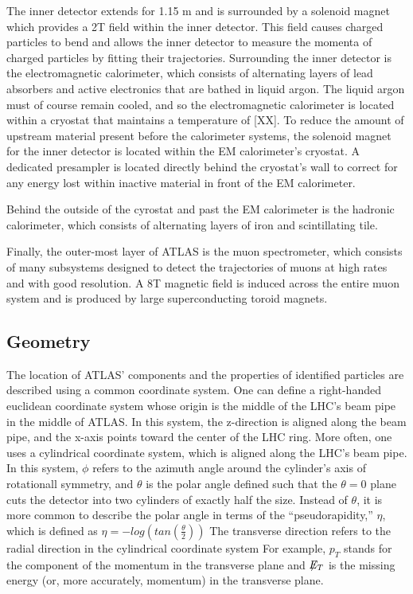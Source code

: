 The inner detector extends for 1.15 m and is surrounded by a solenoid magnet which provides a 2T field within the inner detector.
This field causes charged particles to bend and allows the inner detector to measure the momenta of charged particles by fitting their trajectories.
Surrounding the inner detector is the electromagnetic calorimeter, which consists of alternating layers of lead absorbers and active electronics that are bathed in liquid argon.
The liquid argon must of course remain cooled, and so the electromagnetic calorimeter is located within a cryostat that maintains a temperature of [XX].
To reduce the amount of upstream material present before the calorimeter systems, the solenoid magnet for the inner detector is located within the EM calorimeter's cryostat.
A dedicated presampler is located directly behind the cryostat's wall to correct for any energy lost within inactive material in front of the EM calorimeter.

Behind the outside of the cyrostat and past the EM calorimeter is the hadronic calorimeter, which consists of alternating layers of iron and scintillating tile.

Finally, the outer-most layer of ATLAS is the muon spectrometer, which consists of many subsystems designed to detect the trajectories of muons at high rates and with good resolution. 
A 8T magnetic field is induced across the entire muon system and is produced by large superconducting toroid magnets.


\subsection{Geometry}
The location of ATLAS' components and the properties of identified particles are described using a common coordinate system.
One can define a right-handed euclidean coordinate system whose origin is the middle of the LHC's beam pipe in the middle of ATLAS.
In this system, the z-direction is aligned along the beam pipe, and the x-axis points toward the center of the LHC ring.
More often, one uses a cylindrical coordinate system, which is aligned along the LHC's beam pipe.
In this system, $\phi$ refers to the azimuth angle around the cylinder's axis of rotationall symmetry, and $\theta$ is the polar angle defined such that the $\theta=0$ plane cuts the detector into two cylinders of exactly half the size.
Instead of $\theta$, it is more common to describe the polar angle in terms of the ``pseudorapidity,'' $\eta$, which is defined as $\eta = -log(tan(\frac{\theta}{2}))$
The transverse direction refers to the radial direction in the cylindrical coordinate system 
For example, $p_{T}$ stands for the component of the momentum in the transverse plane and $\not\!\!{E_{T}}$ is the missing energy (or, more accurately, momentum) in the transverse plane.



